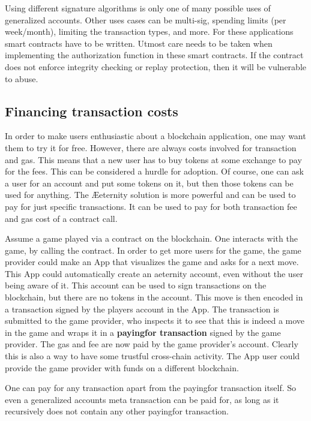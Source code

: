 Using different signature algorithms is only one of many possible uses
of generalized accounts. Other uses cases can be multi-sig, spending
limits (per week/month), limiting the transaction types, and more. For
these applications smart contracts have to be written. Utmost care
needs to be taken when implementing the authorization
function in these smart contracts. If the contract does not enforce
integrity checking or replay protection, then it will be vulnerable to
abuse.


\subsection{Financing transaction costs}
\label{sect:payingfor}

In order to make users enthusiastic about a blockchain application,
one may want them to try it for free. However, there are always costs
involved for transaction and gas. This means that a new user has to
buy tokens at some exchange to pay for the fees. This can be considered
a hurdle for adoption. Of course, one can ask a user for an account and put
some tokens on it, but then those tokens can be used for anything.
The {\AE}eternity solution is more powerful and can be used to pay for
just specific transactions. It can be used to pay for both transaction
fee and gas cost of a contract call.

Assume a game played via a contract on the blockchain. One interacts
with the game, by calling the contract. In order to get more users for
the game, the game provider could make an App that visualizes
the game and asks for a next move. This App could automatically create
an aeternity account, even without the user being aware of it. This
account can be used to sign transactions on the blockchain, but there
are no tokens in the account. This move is then encoded in a
transaction signed by the players account in the App. The transaction
is submitted to the game provider, who inspects it to see that this
is indeed a move in the game and wraps it in a \textbf{payingfor
  transaction} signed by the game provider. The gas and fee are now
paid by the game provider's account.
Clearly this is also a way to have some trustful cross-chain
activity. The App user could provide the game provider with funds on a
different blockchain.

One can pay for any transaction apart from the payingfor transaction
itself. So even a generalized accounts meta transaction can be paid
for, as long as it recursively does not contain any other payingfor
transaction.
